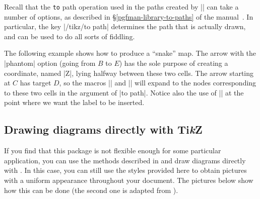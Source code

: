 \documentclass[a4paper]{ltxdoc}
\begin{document}
Recall that the \texttt{to} path operation used in the paths created by
|\arrow| can take a number of options, as described in 
\S\ref*{pgfman-library-to-paths} of the \pgfname{} manual~\cite{pgfman}.  In particular, the
key |/tikz/to path| determines the path that is actually drawn, and
can be used to do all sorts of fiddling.

\begin{codeexample}[]
\end{codeexample}%

The following example shows how to produce a ``snake'' map.  The arrow
with the |phantom| option (going from $B$ to $E$) has the sole purpose
of creating a coordinate, named |Z|, lying halfway between these two
cells.  The arrow starting at $C$ has target $D$, so the macros
|\tikztostart| and |\tikztotarget| will expand to the nodes
corresponding to these two cells in the argument of |to path|.  Notice
also the use of |\tikztonodes| at the point where we want the label to
be inserted.
\begin{codeexample}[]
\end{codeexample}

\subsection{Drawing diagrams directly with Ti\emph{k}Z}
\label{sec:draw-diagr-directly}

If you find that this package is not flexible enough for some
particular application, you can use the methods described in
\cite{milne} and draw diagrams directly with \tikzname.  In this case,
you can still use the styles provided here to obtain pictures with a
uniform appearance throughout your document.  The pictures below show
how this can be done (the second one is adapted from \cite{milne}).
\end{document}
